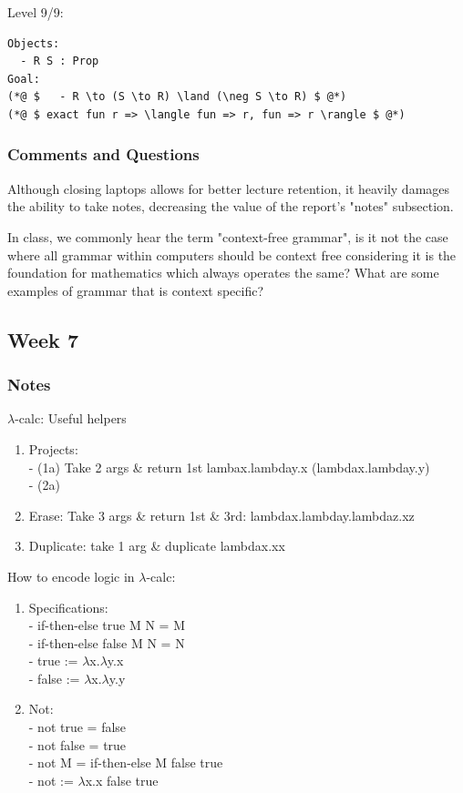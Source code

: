 \documentclass{article}
\theoremstyle{theorem}
\theoremstyle{definition}
\theoremstyle{remark}
\begin{document}
Level 9/9:
\begin{lstlisting}
Objects:
  - R S : Prop
Goal:
(*@ $   - R \to (S \to R) \land (\neg S \to R) $ @*)
(*@ $ exact fun r => \langle fun => r, fun => r \rangle $ @*)
\end{lstlisting}

\subsubsection*{Comments and Questions}

Although closing laptops allows for better lecture retention, it heavily damages the ability to take notes, decreasing the value of the report's "notes" subsection.

In class, we commonly hear the term "context-free grammar", is it not the case where all grammar within computers should be context free considering it is the foundation for mathematics which always operates the same? What are some examples of grammar that is context specific?

\subsection{Week 7}

\subsubsection*{Notes}
$\lambda$-calc: Useful helpers

\begin{enumerate}
  \item Projects: \\
    - (1a) Take 2 args \& return 1st lambax.lambday.x (lambdax.lambday.y)\\ 
    - (2a) 
  \item Erase: Take 3 args \& return 1st \& 3rd: lambdax.lambday.lambdaz.xz
  \item Duplicate: take 1 arg \& duplicate lambdax.xx
\end{enumerate}

How to encode logic in $\lambda$-calc:
\begin{enumerate}
  \item Specifications: \\
        - if-then-else true M N = M \\
        - if-then-else false M N = N \\
        - true := $\lambda$x.$\lambda$y.x \\
        - false := $\lambda$x.$\lambda$y.y \\
  \item Not: \\
        - not true = false \\
        - not false = true \\
        - not M = if-then-else M false true \\
        - not := $\lambda$x.x false true \\
\end{enumerate}
\end{document}
